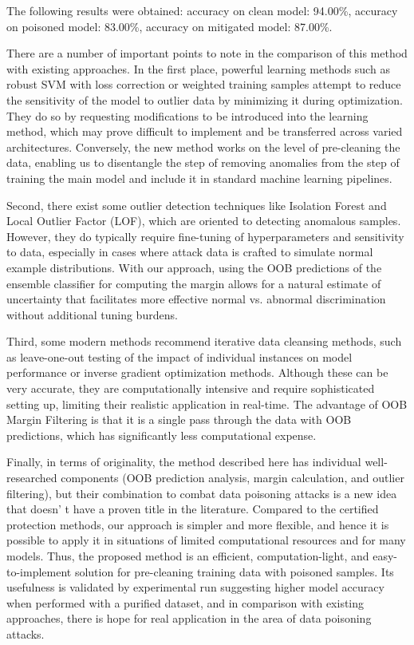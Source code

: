 \begin{multicols}{2}
The following results were obtained: accuracy on clean model: 94.00\%,
accuracy on poisoned model: 83.00\%, accuracy on mitigated model:
87.00\%.

There are a number of important points to note in the comparison of this
method with existing approaches. In the first place, powerful learning
methods such as robust SVM with loss correction or weighted training
samples attempt to reduce the sensitivity of the model to outlier data
by minimizing it during optimization. They do so by requesting
modifications to be introduced into the learning method, which may prove
difficult to implement and be transferred across varied architectures.
Conversely, the new method works on the level of pre-cleaning the data,
enabling us to disentangle the step of removing anomalies from the step
of training the main model and include it in standard machine learning
pipelines.

Second, there exist some outlier detection techniques like Isolation
Forest and Local Outlier Factor (LOF), which are oriented to detecting
anomalous samples. However, they do typically require fine-tuning of
hyperparameters and sensitivity to data, especially in cases where
attack data is crafted to simulate normal example distributions. With
our approach, using the OOB predictions of the ensemble classifier for
computing the margin allows for a natural estimate of uncertainty that
facilitates more effective normal vs. abnormal discrimination without
additional tuning burdens.

Third, some modern methods recommend iterative data cleansing methods,
such as leave-one-out testing of the impact of individual instances on
model performance or inverse gradient optimization methods. Although
these can be very accurate, they are computationally intensive and
require sophisticated setting up, limiting their realistic application
in real-time. The advantage of OOB Margin Filtering is that it is a
single pass through the data with OOB predictions, which has
significantly less computational expense.

Finally, in terms of originality, the method described here has
individual well-researched components (OOB prediction analysis, margin
calculation, and outlier filtering), but their combination to combat
data poisoning attacks is a new idea that doesn' t have a
proven title in the literature. Compared to the certified protection
methods, our approach is simpler and more flexible, and hence it is
possible to apply it in situations of limited computational resources
and for many models. Thus, the proposed method is an efficient,
computation-light, and easy-to-implement solution for pre-cleaning
training data with poisoned samples. Its usefulness is validated by
experimental run suggesting higher model accuracy when performed with a
purified dataset, and in comparison with existing approaches, there is
hope for real application in the area of data poisoning attacks.


\end{multicols}

